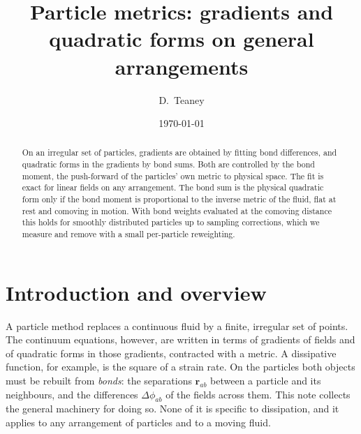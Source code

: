 \documentclass[11pt,aps,preprint,nofootinbib,superscriptaddress,tightenlines]{revtex4-2}
\begin{document}
\title{Particle metrics: gradients and quadratic forms on general arrangements}
\author{D.~Teaney}
\date{\today}

\begin{abstract}
On an irregular set of particles, gradients are obtained by fitting bond
differences, and quadratic forms in the gradients by bond sums.  Both are
controlled by the bond moment, the push-forward of the particles' own metric
to physical space.  The fit is exact for linear fields on any arrangement.
The bond sum is the physical quadratic form only if the bond moment is
proportional to the inverse metric of the fluid, flat at rest and comoving in
motion.  With bond weights evaluated at the comoving distance this holds for
smoothly distributed particles up to sampling corrections, which we measure
and remove with a small per-particle reweighting.
\end{abstract}

\maketitle


\section{Introduction and overview}
\label{sec:intro}

A particle method replaces a continuous fluid by a finite, irregular set of
points.  The continuum equations, however, are written in terms of gradients
of fields and of quadratic forms in those gradients, contracted with a
metric.  A dissipative function, for example, is the square of a strain rate.
On the particles both objects must be rebuilt from \emph{bonds}: the
separations $\bm r_{ab}$ between a particle and its neighbours, and the
differences $\Delta\phi_{ab}$ of the fields across them.  This note collects the
general machinery for doing so.  None of it is specific to dissipation, and it
applies to any arrangement of particles and to a moving fluid.
\end{document}

